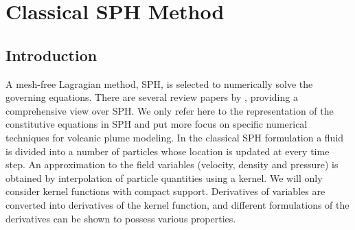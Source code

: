 
\chapter{Classical SPH Method} \label{chapter:classical-SPH}

\section{Introduction}
A mesh-free Lagragian method, SPH, is selected to numerically solve the governing equations. There are several review papers by \citet{monaghan1992smoothed, monaghan2005smoothed, rosswog2009astrophysical, price2012smoothed, monaghan2012smoothed}, providing a comprehensive view over SPH. We only refer here to the representation of the constitutive equations in SPH and put more focus on specific numerical techniques for volcanic plume modeling.
In the classical SPH formulation a fluid is divided into a number of particles whose location is updated at every time step. An approximation to the field variables (velocity, density and pressure) is obtained by interpolation of particle quantities using a kernel.
We will only consider kernel functions with compact support. Derivatives of variables are converted into derivatives of the kernel function, and different formulations of the derivatives can be shown to possess various properties.

